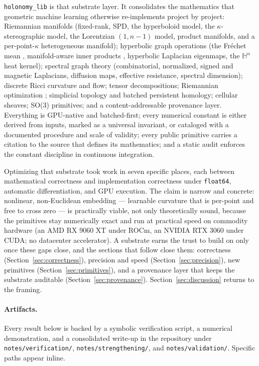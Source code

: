 \documentclass{article}
\newcommand{\Hyp}{\mathbb{H}}
\newcommand{\kp}{\kappa}
\newcommand{\code}[1]{\texttt{#1}}
\begin{document}
\code{holonomy\_lib} is that substrate layer. It consolidates the
mathematics that geometric machine learning otherwise re-implements
project by project: Riemannian manifolds (fixed-rank, SPD, the
hyperboloid model, the $\kp$-stereographic model, the Lorentzian
$(1,n{-}1)$ model, product manifolds, and a per-point-$\kp$
heterogeneous manifold); hyperbolic graph operations (the Fr\'echet mean
\citep{karcher1977riemannian}, manifold-aware inner products
\citep{pennec2006intrinsic}, hyperbolic Laplacian eigenmaps, the
$\Hyp^n$ heat kernel); spectral graph theory (combinatorial, normalized,
signed and magnetic Laplacians, diffusion maps, effective resistance,
spectral dimension); discrete Ricci curvature and flow; tensor
decompositions; Riemannian optimization \citep{absil2008optimization};
simplicial topology and batched
persistent homology; cellular sheaves; \mbox{SO(3)} primitives; and a
content-addressable provenance layer. Everything is GPU-native and
batched-first; every numerical constant is either derived from inputs,
marked as a universal invariant, or cataloged with a documented
procedure and scale of validity; every public primitive carries a
citation to the source that defines its mathematics; and a static audit
enforces the constant discipline in continuous integration.

Optimizing that substrate took work in seven specific places, each
between mathematical correctness and implementation correctness under
\code{float64}, automatic differentiation, and GPU execution. The claim
is narrow and concrete: nonlinear, non-Euclidean embedding --- learnable
curvature that is per-point and free to cross zero --- is practically
viable, not only theoretically sound, because the primitives stay
numerically exact and run at practical speed on commodity hardware (an
AMD RX 9060 XT under ROCm, an NVIDIA RTX 3060 under CUDA; no datacenter
accelerator). A substrate earns the trust to build on only once these
gaps close, and the sections that follow close them: correctness
(Section~\ref{sec:correctness}), precision and speed
(Section~\ref{sec:precision}), new primitives
(Section~\ref{sec:primitives}), and a provenance layer that keeps the
substrate auditable (Section~\ref{sec:provenance}).
Section~\ref{sec:discussion} returns to the framing.

\paragraph{Artifacts.} Every result below is backed by a symbolic
verification script, a numerical demonstration, and a consolidated
write-up in the repository under \code{notes/verification/},
\code{notes/strengthening/}, and \code{notes/validation/}. Specific
paths appear inline.
\end{document}
